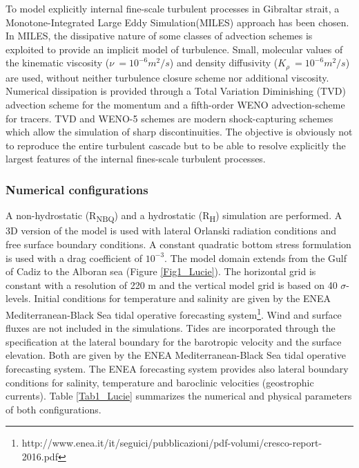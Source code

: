 \vspace{\baselineskip}
To model explicitly internal fine-scale turbulent processes in Gibraltar strait,  a Monotone-Integrated Large Eddy Simulation{\fontsize{11pt}{13.2pt}\selectfont  }(MILES) approach has been chosen. In MILES, the dissipative nature of some classes of advection schemes is exploited to provide an implicit model of turbulence. Small, molecular values of the kinematic viscosity ($\nu\ = 10^{-6} m^{2}/s$) and density diffusivity ($K_\rho\ = 10^{-6} m^2/s$) are used, without neither turbulence closure scheme nor additional viscosity. Numerical dissipation is provided through a Total Variation Diminishing (TVD) advection scheme for the momentum and a fifth-order WENO advection-scheme for tracers. TVD and WENO-5 schemes are modern shock-capturing schemes which allow the simulation of sharp discontinuities. The objective is obviously not to reproduce the entire turbulent cascade but to be able to resolve explicitly the largest features of the internal fines-scale turbulent processes. \par


\vspace{\baselineskip}
\subsubsection{Numerical configurations}

\vspace{\baselineskip}
A non-hydrostatic (R\textsubscript{NBQ}) and a hydrostatic (R\textsubscript{H}) simulation are performed. A 3D version of the model is used with lateral Orlanski radiation conditions and free surface boundary conditions. A constant quadratic bottom stress formulation is used with a drag coefficient of $10^{-3}$. The model domain extends from the Gulf of Cadiz to the Alboran sea (Figure \ref{Fig1_Lucie}). The horizontal grid is constant with a resolution of 220 m and the vertical model grid is based on 40 $\sigma$-levels. Initial conditions for temperature and salinity are given by the ENEA Mediterranean-Black Sea tidal operative forecasting system\footnote{http://www.enea.it/it/seguici/pubblicazioni/pdf-volumi/cresco-report-2016.pdf}. Wind and surface fluxes are not included in the simulations. Tides are incorporated through the specification at the lateral boundary for the barotropic velocity and the surface elevation. Both are given by the ENEA Mediterranean-Black Sea tidal operative forecasting system. The ENEA forecasting system provides also lateral boundary conditions for salinity, temperature and baroclinic velocities (geostrophic currents). Table \ref{Tab1_Lucie} summarizes the numerical and physical parameters of both configurations. \par

